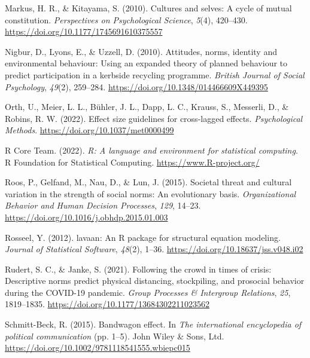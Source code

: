 \documentclass[
  man, donotrepeattitle,mask,floatsintext]{apa6}
\newlength{\cslhangindent}
\newlength{\cslentryspacingunit} %
\newenvironment{CSLReferences}[2] %
 {%
  \setlength{\parindent}{0pt}
  \ifodd #1
  \let\oldpar\par
  \def\par{\hangindent=\cslhangindent\oldpar}
  \fi
  \setlength{\parskip}{#2\cslentryspacingunit}
 }%
 {}
\begin{document}
\begin{CSLReferences}{1}{0}
\leavevmode{}%
Markus, H. R., \& Kitayama, S. (2010). Cultures and selves: A cycle of mutual constitution. \emph{Perspectives on Psychological Science}, \emph{5}(4), 420--430. \url{https://doi.org/10.1177/1745691610375557}

\leavevmode{}%
Nigbur, D., Lyons, E., \& Uzzell, D. (2010). Attitudes, norms, identity and environmental behaviour: Using an expanded theory of planned behaviour to predict participation in a kerbside recycling programme. \emph{British Journal of Social Psychology}, \emph{49}(2), 259--284. \url{https://doi.org/10.1348/014466609X449395}

\leavevmode{}%
Orth, U., Meier, L. L., Bühler, J. L., Dapp, L. C., Krauss, S., Messerli, D., \& Robins, R. W. (2022). Effect size guidelines for cross-lagged effects. \emph{Psychological Methods}. \url{https://doi.org/10.1037/met0000499}

\leavevmode{}%
R Core Team. (2022). \emph{R: A language and environment for statistical computing}. R Foundation for Statistical Computing. \url{https://www.R-project.org/}

\leavevmode{}%
Roos, P., Gelfand, M., Nau, D., \& Lun, J. (2015). Societal threat and cultural variation in the strength of social norms: An evolutionary basis. \emph{Organizational Behavior and Human Decision Processes}, \emph{129}, 14--23. \url{https://doi.org/10.1016/j.obhdp.2015.01.003}

\leavevmode{}%
Rosseel, Y. (2012). {lavaan}: An {R} package for structural equation modeling. \emph{Journal of Statistical Software}, \emph{48}(2), 1--36. \url{https://doi.org/10.18637/jss.v048.i02}

\leavevmode{}%
Rudert, S. C., \& Janke, S. (2021). Following the crowd in times of crisis: Descriptive norms predict physical distancing, stockpiling, and prosocial behavior during the {COVID-19} pandemic. \emph{Group Processes \& Intergroup Relations}, \emph{25}, 1819--1835. \url{https://doi.org/10.1177/13684302211023562}

\leavevmode{}%
Schmitt-Beck, R. (2015). Bandwagon effect. In \emph{The international encyclopedia of political communication} (pp. 1--5). John Wiley \& Sons, Ltd. \url{https://doi.org/10.1002/9781118541555.wbiepc015}


\end{CSLReferences}
\end{document}
